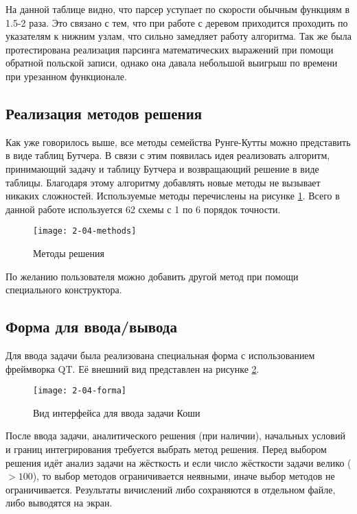 На данной таблице видно, что парсер уступает по скорости обычным функциям в 1.5-2 раза. Это связано с тем, что при работе с деревом
приходится проходить по указателям к нижним узлам, что сильно замедляет работу алгоритма.
Так же была протестирована реализация парсинга математических выражений при помощи обратной польской записи, однако она давала небольшой
выигрыш по времени при урезанном функционале.

\subsection{Реализация методов решения}

Как уже говорилось выше, все методы семейства Рунге-Кутты можно представить в виде таблиц Бутчера. В связи с этим появилась идея
реализовать алгоритм, принимающий задачу и таблицу Бутчера и возвращающий решение в виде таблицы. Благодаря этому алгоритму добавлять
новые методы не вызывает никаких сложностей. Используемые методы перечислены на рисунке \ref{fig:SolveMethods}.
Всего в данной работе используется 62 схемы с 1 по 6 порядок точности.

\begin{figure}
    \texttt{[image: 2-04-methods]}
    \caption{Методы решения}
    \label{fig:SolveMethods}
\end{figure}

По желанию пользователя можно добавить другой метод при помощи специального конструктора.

\subsection{Форма для ввода/вывода}

Для ввода задачи была реализована специальная форма с использованием фреймворка QT. Её внешний вид представлен на рисунке \ref{fig:forma}.

\begin{figure}
    \texttt{[image: 2-04-forma]}
    \caption{Вид интерфейса для ввода задачи Коши}
    \label{fig:forma}
\end{figure}

После ввода задачи, аналитического решения (при наличии), начальных условий и границ интегрирования требуется выбрать метод решения.
Перед выбором решения идёт анализ задачи на жёсткость и если число жёсткости задачи велико ($> 100$), то выбор методов ограничивается
неявными, иначе выбор методов не ограничивается. Результаты вичислений либо сохраняются в отдельном файле, либо выводятся на экран.

